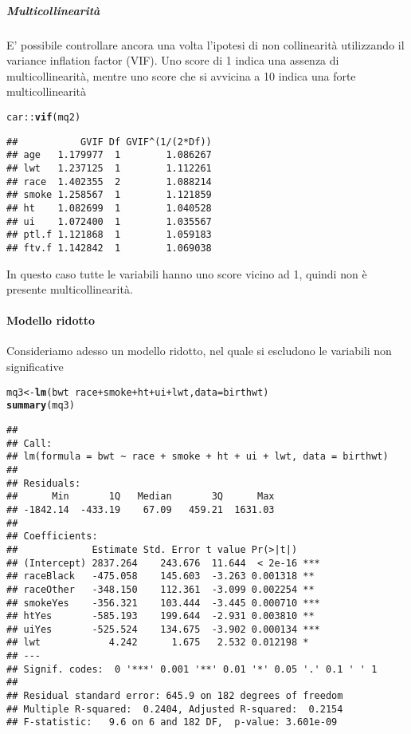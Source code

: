 \documentclass{article}\usepackage[]{graphicx}\usepackage[]{color}
\makeatletter
\newcommand{\hlopt}[1]{\textcolor[rgb]{0,0,0}{#1}}%
\newcommand{\hlstd}[1]{\textcolor[rgb]{0.345,0.345,0.345}{#1}}%
\newcommand{\hlkwb}[1]{\textcolor[rgb]{0.69,0.353,0.396}{#1}}%
\newcommand{\hlkwc}[1]{\textcolor[rgb]{0.333,0.667,0.333}{#1}}%
\newcommand{\hlkwd}[1]{\textcolor[rgb]{0.737,0.353,0.396}{\textbf{#1}}}%
\newenvironment{kframe}{%
 \def\at@end@of@kframe{}%
 \ifinner\ifhmode%
  \def\at@end@of@kframe{\end{minipage}}%
  \begin{minipage}{\columnwidth}%
 \fi\fi%
 \def\FrameCommand##1{\hskip\@totalleftmargin \hskip-\fboxsep
 \colorbox{shadecolor}{##1}\hskip-\fboxsep
     \hskip-\linewidth \hskip-\@totalleftmargin \hskip\columnwidth}%
 \MakeFramed {\advance\hsize-\width
   \@totalleftmargin\z@ \linewidth\hsize
   \@setminipage}}%
 {\par\unskip\endMakeFramed%
 \at@end@of@kframe}
\newenvironment{knitrout}{}{} %
\makeatother
\begin{document}
\subparagraph{Multicollinearità}
E' possibile controllare ancora una volta l'ipotesi di non collinearità utilizzando il variance inflation factor (VIF). Uno score di 1 indica una assenza di multicollinearità, mentre uno score che si avvicina a 10 indica una forte multicollinearità

\begin{knitrout}
\color{fgcolor}\begin{kframe}
\begin{alltt}
\hlstd{car}\hlopt{::}\hlkwd{vif}\hlstd{(mq2)}
\end{alltt}
\begin{verbatim}
##           GVIF Df GVIF^(1/(2*Df))
## age   1.179977  1        1.086267
## lwt   1.237125  1        1.112261
## race  1.402355  2        1.088214
## smoke 1.258567  1        1.121859
## ht    1.082699  1        1.040528
## ui    1.072400  1        1.035567
## ptl.f 1.121868  1        1.059183
## ftv.f 1.142842  1        1.069038
\end{verbatim}
\end{kframe}
\end{knitrout}

In questo caso tutte le variabili hanno uno score vicino ad 1, quindi non è presente multicollinearità.

\paragraph{Modello ridotto}
Consideriamo adesso un modello ridotto, nel quale si escludono le variabili non significative

\begin{knitrout}
\color{fgcolor}\begin{kframe}
\begin{alltt}
\hlstd{mq3} \hlkwb{<-} \hlkwd{lm}\hlstd{(bwt} \hlopt{~}  \hlstd{race} \hlopt{+} \hlstd{smoke} \hlopt{+} \hlstd{ht} \hlopt{+} \hlstd{ui} \hlopt{+} \hlstd{lwt,}\hlkwc{data}\hlstd{=birthwt)}
\hlkwd{summary}\hlstd{(mq3)}
\end{alltt}
\begin{verbatim}
## 
## Call:
## lm(formula = bwt ~ race + smoke + ht + ui + lwt, data = birthwt)
## 
## Residuals:
##      Min       1Q   Median       3Q      Max 
## -1842.14  -433.19    67.09   459.21  1631.03 
## 
## Coefficients:
##             Estimate Std. Error t value Pr(>|t|)    
## (Intercept) 2837.264    243.676  11.644  < 2e-16 ***
## raceBlack   -475.058    145.603  -3.263 0.001318 ** 
## raceOther   -348.150    112.361  -3.099 0.002254 ** 
## smokeYes    -356.321    103.444  -3.445 0.000710 ***
## htYes       -585.193    199.644  -2.931 0.003810 ** 
## uiYes       -525.524    134.675  -3.902 0.000134 ***
## lwt            4.242      1.675   2.532 0.012198 *  
## ---
## Signif. codes:  0 '***' 0.001 '**' 0.01 '*' 0.05 '.' 0.1 ' ' 1
## 
## Residual standard error: 645.9 on 182 degrees of freedom
## Multiple R-squared:  0.2404,	Adjusted R-squared:  0.2154 
## F-statistic:   9.6 on 6 and 182 DF,  p-value: 3.601e-09
\end{verbatim}
\end{kframe}
\end{knitrout}
\end{document}
